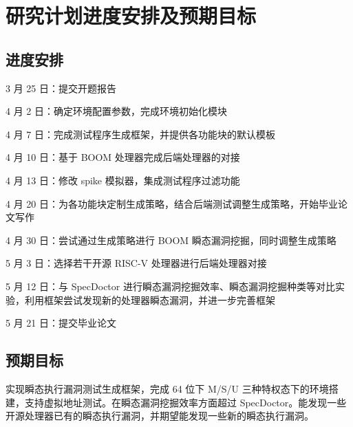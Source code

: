\section{研究计划进度安排及预期目标}

\subsection{进度安排}

3 月 25 日：提交开题报告\par
4 月 2 日：确定环境配置参数，完成环境初始化模块\par
4 月 7 日：完成测试程序生成框架，并提供各功能块的默认模板\par
4 月 10 日：基于 BOOM 处理器完成后端处理器的对接\par
4 月 13 日：修改 spike 模拟器，集成测试程序过滤功能\par
4 月 20 日：为各功能块定制生成策略，结合后端测试调整生成策略，开始毕业论文写作\par
4 月 30 日：尝试通过生成策略进行 BOOM 瞬态漏洞挖掘，同时调整生成策略\par
5 月 3 日：选择若干开源 RISC-V 处理器进行后端处理器对接\par
5 月 12 日：与 SpecDoctor 进行瞬态漏洞挖掘效率、瞬态漏洞挖掘种类等对比实验，利用框架尝试发现新的处理器瞬态漏洞，并进一步完善框架\par
5 月 21 日：提交毕业论文\par

\subsection{预期目标}

实现瞬态执行漏洞测试生成框架，完成 64 位下 M/S/U 三种特权态下的环境搭建，支持虚拟地址测试。在瞬态漏洞挖掘效率方面超过 SpecDoctor。能发现一些开源处理器已有的瞬态执行漏洞，并期望能发现一些新的瞬态执行漏洞。
